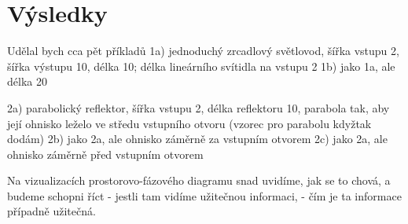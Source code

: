 \chapter{Výsledky}


Udělal bych cca pět příkladů
1a) jednoduchý zrcadlový světlovod, šířka vstupu 2, šířka výstupu 10,
délka 10; délka lineárního svítidla na vstupu 2
1b) jako 1a, ale délka 20

2a) parabolický reflektor, šířka vstupu 2, délka reflektoru 10, parabola
tak, aby její ohnisko leželo ve středu vstupního otvoru (vzorec pro
parabolu kdyžtak dodám)
2b) jako 2a, ale ohnisko záměrně za vstupním otvorem
2c) jako 2a, ale ohnisko záměrně před vstupním otvorem

Na vizualizacích prostorovo-fázového diagramu snad uvidíme, jak se to
chová, a budeme schopni říct
- jestli tam vidíme užitečnou informaci,
- čím je ta informace případně užitečná.

